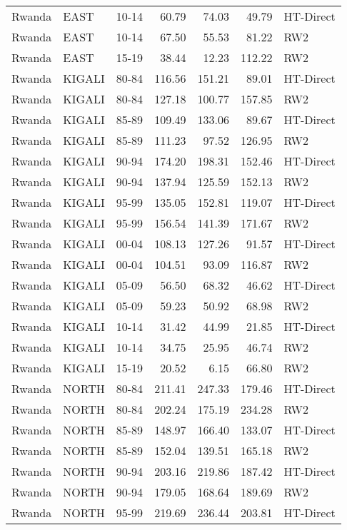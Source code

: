 \begin{longtable}{lllrrrl}
  Rwanda & EAST & 10-14 & 60.79 & 74.03 & 49.79 & HT-Direct \\ 
  Rwanda & EAST & 10-14 & 67.50 & 55.53 & 81.22 & RW2 \\ 
  Rwanda & EAST & 15-19 & 38.44 & 12.23 & 112.22 & RW2 \\ 
  Rwanda & KIGALI & 80-84 & 116.56 & 151.21 & 89.01 & HT-Direct \\ 
  Rwanda & KIGALI & 80-84 & 127.18 & 100.77 & 157.85 & RW2 \\ 
  Rwanda & KIGALI & 85-89 & 109.49 & 133.06 & 89.67 & HT-Direct \\ 
  Rwanda & KIGALI & 85-89 & 111.23 & 97.52 & 126.95 & RW2 \\ 
  Rwanda & KIGALI & 90-94 & 174.20 & 198.31 & 152.46 & HT-Direct \\ 
  Rwanda & KIGALI & 90-94 & 137.94 & 125.59 & 152.13 & RW2 \\ 
  Rwanda & KIGALI & 95-99 & 135.05 & 152.81 & 119.07 & HT-Direct \\ 
  Rwanda & KIGALI & 95-99 & 156.54 & 141.39 & 171.67 & RW2 \\ 
  Rwanda & KIGALI & 00-04 & 108.13 & 127.26 & 91.57 & HT-Direct \\ 
  Rwanda & KIGALI & 00-04 & 104.51 & 93.09 & 116.87 & RW2 \\ 
  Rwanda & KIGALI & 05-09 & 56.50 & 68.32 & 46.62 & HT-Direct \\ 
  Rwanda & KIGALI & 05-09 & 59.23 & 50.92 & 68.98 & RW2 \\ 
  Rwanda & KIGALI & 10-14 & 31.42 & 44.99 & 21.85 & HT-Direct \\ 
  Rwanda & KIGALI & 10-14 & 34.75 & 25.95 & 46.74 & RW2 \\ 
  Rwanda & KIGALI & 15-19 & 20.52 & 6.15 & 66.80 & RW2 \\ 
  Rwanda & NORTH & 80-84 & 211.41 & 247.33 & 179.46 & HT-Direct \\ 
  Rwanda & NORTH & 80-84 & 202.24 & 175.19 & 234.28 & RW2 \\ 
  Rwanda & NORTH & 85-89 & 148.97 & 166.40 & 133.07 & HT-Direct \\ 
  Rwanda & NORTH & 85-89 & 152.04 & 139.51 & 165.18 & RW2 \\ 
  Rwanda & NORTH & 90-94 & 203.16 & 219.86 & 187.42 & HT-Direct \\ 
  Rwanda & NORTH & 90-94 & 179.05 & 168.64 & 189.69 & RW2 \\ 
  Rwanda & NORTH & 95-99 & 219.69 & 236.44 & 203.81 & HT-Direct \\ 

\end{longtable}
